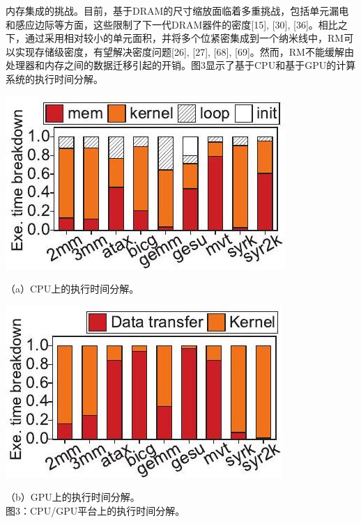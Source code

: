 \documentclass[10pt]{article}
\begin{document}
内存集成的挑战。目前，基于DRAM的尺寸缩放面临着多重挑战，包括单元漏电和感应边际等方面，这些限制了下一代DRAM器件的密度[15], [30], [36]。相比之下，通过采用相对较小的单元面积，并将多个位紧密集成到一个纳米线中，RM可以实现存储级密度，有望解决密度问题[26], [27], [68], [69]。然而，RM不能缓解由处理器和内存之间的数据迁移引起的开销。图3显示了基于CPU和基于GPU的计算系统的执行时间分解。

\begin{center}
\includegraphics[max width=\textwidth]{2024_05_12_abeba8a85da5b5ec4c7bg-03(3)}
\end{center}

（a）CPU上的执行时间分解。


\begin{center}
\includegraphics[max width=\textwidth]{2024_05_12_abeba8a85da5b5ec4c7bg-03(4)}
\end{center}

（b）GPU上的执行时间分解。\\
图3：CPU/GPU平台上的执行时间分解。
\end{document}
